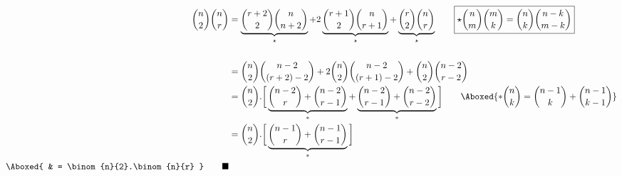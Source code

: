 
\begin{align*}
  \binom{n}{2} \binom{n}{r} & = \underbrace{\binom{r+2}{2} \binom{n}{n+2}}_{\star} + 2\underbrace{\binom{r+1}{2}\binom{n}{r+1}}_{\star} + \underbrace{\binom{r}{2} \binom{n}{r}}_{\star}  \qquad \boxed{\star \binom{n}{m} \binom{m}{k} = \binom{n}{k}\binom{n-k}{m-k}} \\\\
  & = \binom{n}{2} \binom{n-2}{(r+2)-2} + 2\binom{n}{2}\binom{n-2}{(r+1)-2} + \binom{n}{2}\binom{n-2}{r-2} \\
  & = \binom{n}{2}.\bigg[ \underbrace{\binom{n-2}{r} + \binom{n-2}{r-1}}_{\ast} + \underbrace{\binom{n-2}{r-1} + \binom{n-2}{r-2}}_{\ast} \bigg] \qquad \Aboxed{\ast \binom{n}{k} = \binom{n-1}{k} + \binom{n-1}{k-1}} \\
  & = \binom{n}{2}.\bigg[\underbrace{\binom{n-1}{r} + \binom{n-1}{r-1}}_{\ast}\bigg] \\
  \Aboxed{ & = \binom{n}{2}.\binom{n}{r} } \qquad \blacksquare \\
\end{align*}


